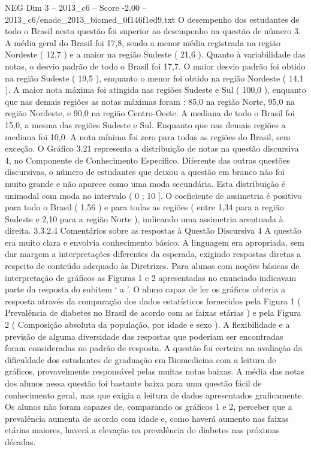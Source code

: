 \begin{textsample}{NEG Dim 3 – 2013\_c6 – Score -2.00 – 2013\_c6/enade\_2013\_biomed\_0f146f1ed9.txt}
O desempenho dos estudantes de todo o Brasil nesta questão foi superior ao desempenho na questão de número 3.
A média geral do Brasil foi 17,8, sendo a menor média registrada na região Nordeste ( 12,7 ) e a maior na região Sudeste ( 21,6 ).
Quanto à variabilidade das notas, o desvio padrão de todo o Brasil foi 17,7.
O maior desvio padrão foi obtido na região Sudeste ( 19,5 ), enquanto o menor foi obtido na região Nordeste ( 14,1 ).
A maior nota máxima foi atingida nas regiões Sudeste e Sul ( 100,0 ), enquanto que nas demais regiões as notas máximas foram : 85,0 na região Norte, 95,0 na região Nordeste, e 90,0 na região Centro-Oeste.
A mediana de todo o Brasil foi 15,0, a mesma das regiões Sudeste e Sul.
Enquanto que nas demais regiões a mediana foi 10,0.
A nota mínima foi zero para todas as regiões do Brasil, sem exceção.
O Gráfico 3.21 representa a distribuição de notas na questão discursiva 4, no Componente de Conhecimento Específico.
Diferente das outras questões discursivas, o número de estudantes que deixou a questão em branco não foi muito grande e não aparece como uma moda secundária.
Esta distribuição é unimodal com moda no intervalo ( 0 ; 10 ].
O coeficiente de assimetria é positivo para todo o Brasil ( 1,56 ) e para todas as regiões ( entre 1,34 para a região Sudeste e 2,10 para a região Norte ), indicando uma assimetria acentuada à direita. 3.3.2.4 Comentários sobre as respostas à Questão Discursiva 4 A questão era muito clara e envolvia conhecimento básico.
A linguagem era apropriada, sem dar margem a interpretações diferentes da esperada, exigindo respostas diretas a respeito de conteúdo adequado às Diretrizes.
Para alunos com noções básicas de interpretação de gráficos as Figuras 1 e 2 apresentadas no enunciado indicavam parte da resposta do subitem ‘ a ’.
O aluno capaz de ler os gráficos obteria a resposta através da comparação dos dados estatísticos fornecidos pela Figura 1 ( Prevalência de diabetes no Brasil de acordo com as faixas etárias ) e pela Figura 2 ( Composição absoluta da população, por idade e sexo ).
A flexibilidade e a previsão de alguma diversidade das respostas que poderiam ser encontradas foram consideradas no padrão de resposta.
A questão foi certeira na avaliação da dificuldade dos estudantes de graduação em Biomedicina com a leitura de gráficos, provavelmente responsável pelas muitas notas baixas.
A média das notas dos alunos nessa questão foi bastante baixa para uma questão fácil de conhecimento geral, mas que exigia a leitura de dados apresentados graficamente.
Os alunos não foram capazes de, comparando os gráficos 1 e 2, perceber que a prevalência aumenta de acordo com idade e, como haverá aumento nas faixas etárias maiores, haverá a elevação na prevalência do diabetes nas próximas décadas.

\end{textsample}
